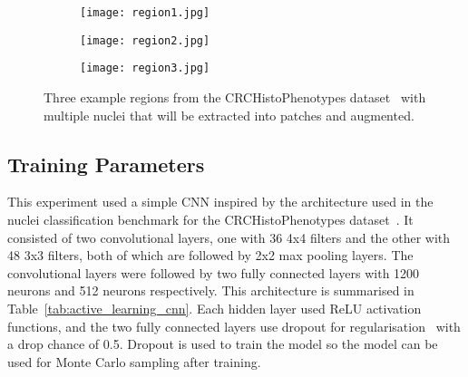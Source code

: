 \begin{figure}[t!]
	\centering
	\begin{subfigure}{0.3\textwidth}
		\texttt{[image: region1.jpg]}
	\end{subfigure}
	\begin{subfigure}{0.3\textwidth}
		\texttt{[image: region2.jpg]}
	\end{subfigure}
	\begin{subfigure}{0.3\textwidth}
		\texttt{[image: region3.jpg]}
	\end{subfigure}
	\caption{Three example regions from the CRCHistoPhenotypes dataset~\cite{sirinukunwattana2016locality} with multiple nuclei that will be extracted into patches and augmented.}
	\label{fig:region_example}
\end{figure}

\subsection{Training Parameters}
This experiment used a simple CNN inspired by the architecture used in the nuclei classification benchmark for the CRCHistoPhenotypes dataset~\citep{sirinukunwattana2016locality}. It consisted of two convolutional layers, one with 36 4x4 filters and the other with 48 3x3 filters, both of which are followed by 2x2 max pooling layers. The convolutional layers were followed by two fully connected layers with 1200 neurons and 512 neurons respectively. This architecture is summarised in Table~\ref{tab:active_learning_cnn}. Each hidden layer used ReLU activation functions, and the two fully connected layers use dropout for regularisation~\citep{srivastava2014dropout} with a drop chance of 0.5. Dropout is used to train the model so the model can be used for Monte Carlo sampling after training.

